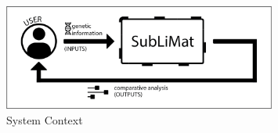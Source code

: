 \documentclass[12pt]{article}
\begin{document}

\begin{figure}[h!]
\begin{center}
 \includegraphics[width=0.8\textwidth]{sublimat_SystemContextFigure}
\caption{System Context}
\label{Fig_SystemContext} 
\end{center}
\end{figure}

\end{document}
